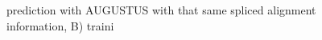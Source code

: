 \documentclass[a4paper,10pt]{report}
\begin{document}
\begin{figure}
\begin{center}
 prediction with AUGUSTUS with that same spliced alignment information, B) traini
\end{center}
\end{figure}
\end{document}
